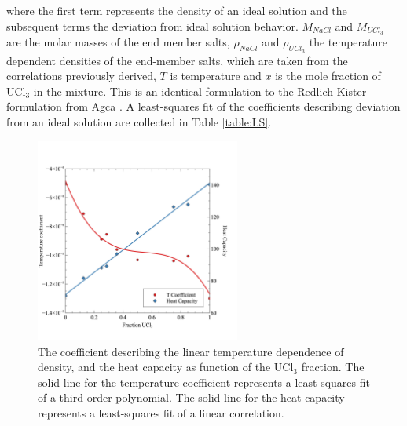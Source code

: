 \documentclass[preprint,3p,10pt,onecolumn,number,sort&compress]{elsarticle}
\begin{document}
where the first term represents the density of an ideal solution and the subsequent terms the deviation from ideal solution behavior. $M_{NaCl}$ and $M_{UCl_3}$ are the molar masses of the end member salts, $\rho_{NaCl}$ and $\rho_{UCl_3}$ the temperature dependent densities of the end-member salts, which are taken from the correlations previously derived, $T$ is temperature and $x$ is the mole fraction of UCl$_3$ in the mixture. This is an identical formulation to the Redlich-Kister formulation from Agca \cite{agca2022}. A least-squares fit of the coefficients describing deviation from an ideal solution are collected in Table \ref{table:LS}.

\begin{figure}[htb]
\centering
\includegraphics[width=0.6\textwidth]{fig9.jpg}
\caption{The coefficient describing the linear temperature dependence of density, and the heat capacity as function of the UCl$_3$ fraction. The solid line for the temperature coefficient represents a least-squares fit of a third order polynomial. The solid line for the heat capacity represents a least-squares fit of a linear correlation.}
\label{fig:TandCp}
\end{figure}
\end{document}
